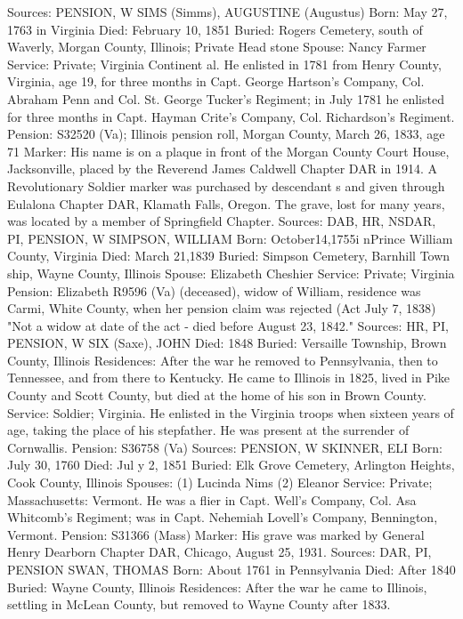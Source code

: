 Sources: PENSION, W 
SIMS (Simms), AUGUSTINE (Augustus) 
Born: May 27, 1763 in Virginia 
Died: February 10, 1851 
Buried: Rogers Cemetery, south of Waverly, Morgan County, Illinois; Private Head stone 
Spouse: Nancy Farmer 
Service: Private; Virginia Continent al. He enlisted in 1781 from Henry County, Virginia, age 19, for three months in Capt. George Hartson's Company, Col. Abraham Penn and Col. St. George Tucker's Regiment; in July 1781 he en­listed for three months in Capt. Hayman Crite's Company, Col. Richardson's Regiment. 
Pension: S32520 (Va); Illinois pension roll, Morgan County, March 26, 1833, age 71 
Marker: His name is on a plaque in front of the Morgan County Court House, Jacksonville, placed by the Reverend James Caldwell Chapter DAR in 1914. A Revolutionary Soldier marker was purchased by descendant s and given through Eulalona Chapter DAR, Klamath Falls, Oregon. The grave, lost for many years, was located by a member of Springfield Chapter. 
Sources: DAB, HR, NSDAR, PI, PENSION, W 
SIMPSON, WILLIAM 
Born: October14,1755i nPrince William County, Virginia 
Died: March 21,1839 
Buried: Simpson Cemetery, Barnhill Town ship, Wayne County, Illinois 
Spouse: Elizabeth Cheshier 
Service: Private; Virginia 
Pension: Elizabeth R9596 (Va) (deceased), widow of William, residence was Carmi, White County, when her pension claim was rejected (Act July 7, 1838) "Not a widow at date of the act - died before August 23, 1842." 
Sources: HR, PI, PENSION, W 
SIX (Saxe), JOHN 
Died: 1848
Buried: Versaille Township, Brown County, Illinois 
Residences: After the war he removed to Pennsylvania, then to Tennessee, and from there to Kentucky. He came to Illinois in 1825, lived in Pike County and Scott County, but died at the home of his son in Brown County. 
Service: Soldier; Virginia. He enlisted in the Virginia troops when sixteen years of age, taking the place of his stepfather. He was present at the surrender of Cornwallis. 
Pension: S36758 (Va) 
Sources: PENSION, W 
SKINNER, ELI
Born:  July 30, 1760
Died:   Jul y 2, 1851
Buried:  Elk Grove Cemetery, Arlington Heights, Cook County, Illinois 
Spouses: (1) Lucinda Nims
     (2) Eleanor
Service:  Private; Massachusetts: Vermont. He was a flier in Capt. Well's Com­pany, Col. Asa Whitcomb's Regiment; was in Capt. Nehemiah Lovell's Company, Bennington, Vermont.
Pension: S31366 (Mass)
Marker: His grave was marked by General Henry Dearborn Chapter DAR, Chicago, August 25, 1931.
Sources: DAR, PI, PENSION 
SWAN, THOMAS
Born: About 1761 in Pennsylvania
Died: After 1840
Buried: Wayne County, Illinois Residences: After the war he came to Illinois, settling in McLean County, but removed to Wayne County after 1833.
